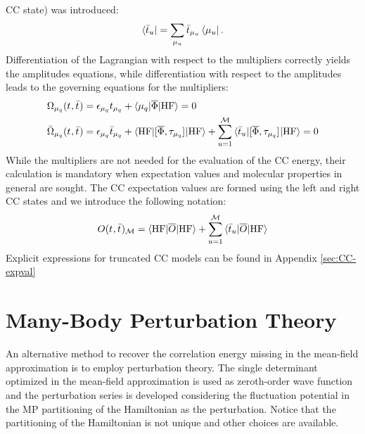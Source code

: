 \acrshort*{CC} state) was introduced:
\begin{equation}
  \bra{\bar{t}_{u}} = \sum_{\mu_u}\bar{t}_{\mu_u}\bra{\mu_u}.
\end{equation}
Differentiation of the Lagrangian with respect to the multipliers
correctly yields the amplitudes equations, while differentiation with
respect to the amplitudes leads to the governing equations for the
multipliers:
\begin{subequations}
  \begin{align}
   \Omega_{\mu_q}(t_{}, \bar{t}_{})  &=
   \epsilon_{\mu_q}t_{\mu_q} + \braket{\mu_q | \overline{\Phi} | \mathrm{HF}}
             = 0 \label{eq:cc-amplitudes}\\
   \bar{\Omega}_{\mu_q}(t_{}, \bar{t}_{})
    &=
    \epsilon_{\mu_q}\bar{t}_{\mu_q} +
    \braket{\mathrm{HF} | [ \overline{\Phi}, \tau_{\mu_q} ]^{} | \mathrm{HF}} +
    \sum_{u=1}^{\mathcal{M}}\braket{\bar{t}_{u} |
    [ \overline{\Phi}, \tau_{\mu_q} ]^{} | \mathrm{HF}}
             = 0 \label{eq:cc-multipliers}
  \end{align}
\end{subequations}
While the multipliers are not needed for the evaluation of the
\acrshort{CC} energy, their calculation is mandatory when expectation values
and molecular properties in general are sought.
The \acrshort{CC} expectation values are formed using the left and
right \acrshort{CC} states and we introduce the following notation:
\begin{equation}\label{eq:cc-expectation-value}
  O(t_{}, \bar{t}_{})_\mathcal{M} = \braket{\mathrm{HF} | \overline{O} | \mathrm{HF} }
  + \sum_{u=1}^{\mathcal{M}}\braket{\bar{t}_{u} | \overline{O} | \mathrm{HF} }
\end{equation}
Explicit expressions for truncated \acrshort{CC} models can be found in
Appendix \ref{sec:CC-expval}

\section{Many-Body Perturbation Theory}\label{sec:mbpt}

An alternative method to recover the correlation energy missing in the
mean-field approximation is to employ perturbation
theory.\autocite{Konishi2009-zb}
The single determinant optimized in the mean-field approximation is used
as zeroth-order wave function and the perturbation series is developed
considering the fluctuation potential in the \acrlong*{MP} partitioning
of the Hamiltonian as the perturbation.\autocite{McWeeny1992-oj, Helgaker2000-tz}
Notice that the partitioning of the Hamiltonian is not unique and
other choices are available.\autocite{Shavitt2009-mr}

